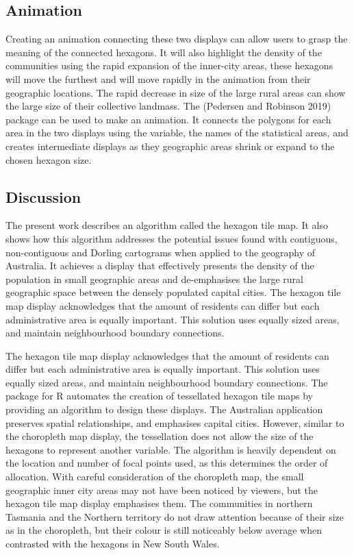 \hypertarget{animation}{%
\subsection{Animation}\label{animation}}

Creating an animation connecting these two displays can allow users to grasp the meaning of the connected hexagons. It will also highlight the density of the communities using the rapid expansion of the inner-city areas, these hexagons will move the furthest and will move rapidly in the animation from their geographic locations. The rapid decrease in size of the large rural areas can show the large size of their collective landmass. The  (Pedersen and Robinson 2019) package can be used to make an animation. It connects the polygons for each area in the two displays using the  variable, the names of the statistical areas, and creates intermediate displays as they geographic areas shrink or expand to the chosen hexagon size.

\hypertarget{discussion}{%
\subsection{Discussion}\label{discussion}}

The present work describes an algorithm called the hexagon tile map.
It also shows how this algorithm addresses the potential issues found with contiguous, non-contiguous and Dorling cartograms when applied to the geography of Australia. It achieves a display that effectively presents the density of the population in small geographic areas and de-emphasises the large rural geographic space between the densely populated capital cities. The hexagon tile map display acknowledges that the amount of residents can differ but each administrative area is equally important. This solution uses equally sized areas, and maintain neighbourhood boundary connections.

The hexagon tile map display acknowledges that the amount of residents can differ but each administrative area is equally important. This solution uses equally sized areas, and maintain neighbourhood boundary connections. The  package for R automates the creation of tessellated hexagon tile maps by providing an algorithm to design these displays. The Australian application preserves spatial relationships, and emphasises capital cities.
However, similar to the choropleth map display, the tessellation does not allow the size of the hexagons to represent another variable. The algorithm is heavily dependent on the location and number of focal points used, as this determines the order of allocation. With careful consideration of the choropleth map, the small geographic inner city areas may not have been noticed by viewers, but the hexagon tile map display emphasises them. The communities in northern Tasmania and the Northern territory do not draw attention because of their size as in the choropleth, but their colour is still noticeably below average when contrasted with the hexagons in New South Wales.

